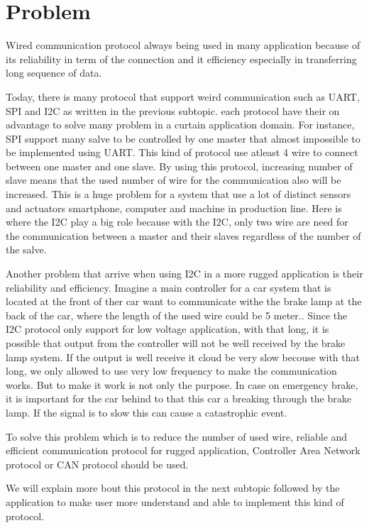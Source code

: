 
\section{Problem}
	Wired communication protocol always being used in many application because of its reliability in term of the connection and it efficiency especially  in transferring long sequence of data.
	
	Today, there is many protocol that support weird communication such as UART, SPI and I2C as written in the previous subtopic. each protocol have their on advantage to solve many problem in a curtain application domain. For instance, SPI support many salve to be controlled by one master that almost impossible to be implemented using UART. This kind of protocol use atleast 4 wire to connect between one master and one slave. By using this protocol, increasing number of slave means that the used number of wire for the communication also will be increased. This is a huge problem for a system that use a lot of distinct sensors and actuators smartphone, computer and machine in production line. Here is where the I2C play a big role because with the I2C, only two wire are need for the communication between a master and their slaves regardless of the number of the salve.
	
	Another problem that arrive when using I2C in a more rugged application is their reliability and efficiency. Imagine a main controller for a car system that is located at the front of ther car want to communicate withe the brake lamp at the back of the car, where the length of the used wire could be 5 meter.. Since the I2C protocol only support for low voltage application, with that long, it is possible that output from the controller will not be well received by the brake lamp system. If the output is well receive it cloud be very slow becouse with that long, we only allowed to use very low frequency to make the communication works. But to make it work is not only the purpose. In case on emergency brake, it is important for the car behind to that this car a breaking through the brake lamp. If the signal is to slow this can cause a catastrophic event.
	
	To solve this problem which is to reduce the number of used wire, reliable and efficient communication protocol for rugged application, Controller Area Network protocol or CAN protocol should be used. 
	
	We will explain more bout this protocol in the next subtopic followed by the application to make user more understand and able to implement this kind of protocol.





